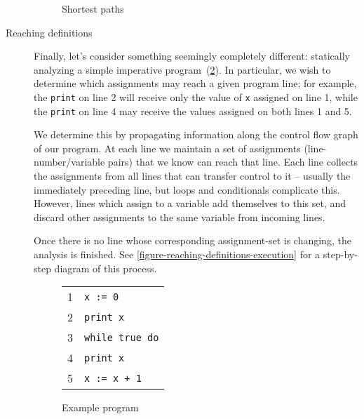 \begin{description}
\begin{figure}[pth]
  \centering
  \XXX
  \caption{Shortest paths}
  \label{figure-shortest-paths}
\end{figure}


\item[Reaching definitions]
%
Finally, let's consider something seemingly completely different: statically
analyzing a simple imperative program~(\cref{figure-reaching-definitions}).
%
%
In particular, we wish to determine which assignments may reach a given program
line; for example, the \texttt{print} on line 2 will receive only the value of
\texttt{x} assigned on line 1, while the \texttt{print} on line 4 may receive
the values assigned on both lines 1 and 5.

We determine this by propagating information along the control flow graph of our
program.
%
At each line we maintain a set of assignments (line-number/variable pairs) that
we know can reach that line.
%
Each line collects the assignments from all lines that can transfer control to
it -- usually the immediately preceding line, but loops and conditionals
complicate this.
%
However, lines which assign to a variable add themselves to this set, and discard other assignments to the same variable from incoming lines.

Once there is no line whose corresponding assignment-set is changing, the analysis is finished.
%
See \cref{figure-reaching-definitions-execution} for a step-by-step diagram of this process.

\begin{figure}[pt]
  \centering
  \ttfamily
  \begin{tabular}{cl}
    1 & \tt x := 0\\
    2 & \tt print x\\
    3 & \tt while true do\\
    4 & \tt\quad print x\\
    5 & \tt\quad x := x + 1
  \end{tabular}
  \caption{Example program}
  \label{figure-reaching-definitions}
\end{figure}



\end{description}

